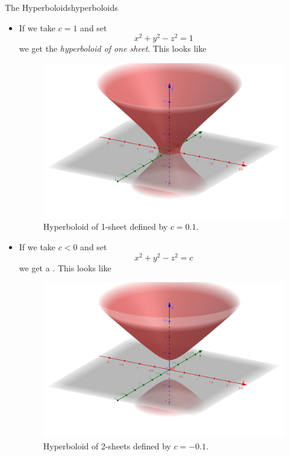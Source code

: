 \begin{ex}{The Hyperboloids}{hyperboloids}
\begin{itemize}
                    \item If we take $c=1$ and set
                    \[
                    x^2+y^2-z^2=1
                    \]
                    we get the \emph{hyperboloid of one sheet}.  This looks like
                    \begin{figure}[H]
                        \centering
                        \includegraphics[width=.8\textwidth]{Figures_Part_6/hyperboloid_1_sheet.png}
                        \caption{Hyperboloid of 1-sheet defined by $c=0.1$.}
                    \end{figure}

                    \item If we take $c<0$ and set
                    \[
                    x^2+y^2-z^2=c
                    \]
                    we get a .  This looks like
                    \begin{figure}[H]
                        \centering
                        \includegraphics[width=.8\textwidth]{Figures_Part_6/hyperboloid_2_sheet.png}
                        \caption{Hyperboloid of 2-sheets defined by $c=-0.1$.}
                    \end{figure}
                \end{itemize}
                \end{ex}

